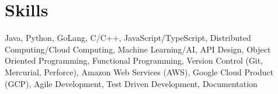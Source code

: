 \documentclass[letterpaper,11pt]{article}
\begin{document}
\section{Skills}
    {\footnotesize Java, Python, GoLang, C/C++, JavaScript/TypeScript, Distributed Computing/Cloud Computing, Machine Learning/AI, API Design, Object Oriented Programming, Functional Programming, Version Control (Git, Mercurial, Perforce), Amazon Web Services (AWS), Google Cloud Product (GCP), Agile Development, Test Driven Development, Documentation}
\end{document}
